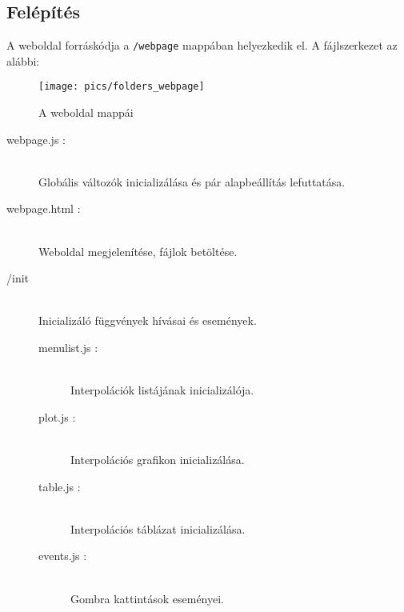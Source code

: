 \subsection{Felépítés}
	A weboldal forráskódja a \texttt{/webpage} mappában helyezkedik el. 
	A fájlszerkezet az alábbi:
	\begin{figure}[h]
		\texttt{[image: pics/folders\_webpage]}
		\centering
		\caption{A weboldal mappái\label{fig:folders_all}}
	\end{figure}
	\begin{description}
		\item[webpage.js :] \hfill \\  
		Globális változók inicializálása és pár alapbeállítás lefuttatása.
		
		\item[webpage.html :]  \hfill \\ 
		Weboldal megjelenítése, fájlok betöltése.
		
		\item[/init] \hfill \\ 
		Inicializáló függvények hívásai és események.
		\begin{description}
			\item[menulist.js : ] \hfill \\ 
				Interpolációk listájának inicializálója.
		  	\item[plot.js : ] \hfill \\ 
		  		Interpolációs grafikon inicializálása.
			\item[table.js : ] \hfill \\ 
				Interpolációs táblázat inicializálása.
		 	\item[events.js : ] \hfill \\ 
		 		Gombra kattintások eseményei.
		\end{description}


\end{description}
